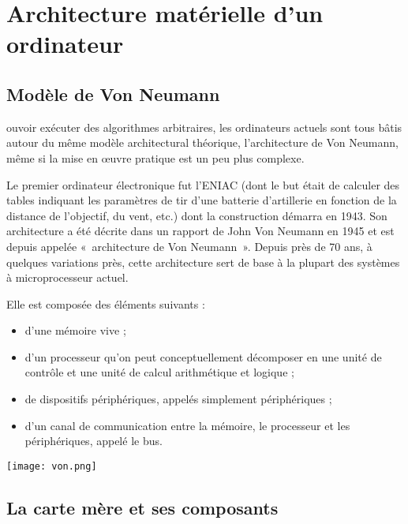 \section{Architecture matérielle d'un ordinateur}
\subsection{Modèle de Von Neumann}

 ouvoir exécuter des algorithmes arbitraires, les ordinateurs actuels sont tous bâtis
autour du même modèle architectural théorique, l’architecture de Von Neumann, même
si la mise en œuvre pratique est un peu plus complexe.

Le premier ordinateur électronique fut l’ENIAC
(dont le but était de calculer des tables indiquant les paramètres de tir d’une batterie d’artillerie
en fonction de la distance de l’objectif, du vent, etc.) dont la construction démarra
en 1943. 
Son architecture a été décrite dans un rapport de John Von Neumann en 1945 et
est depuis appelée «~architecture de Von Neumann~». Depuis près de 70 ans, à quelques variations
près, cette  architecture sert de base à la plupart des systèmes à microprocesseur actuel. 

\begin{minipage}[c]{.49\linewidth}
Elle est composée des éléments suivants :
\begin{itemize}
\item d'une mémoire vive ;
\item d'un processeur qu'on peut conceptuellement décomposer en une unité de contrôle et
une unité de calcul arithmétique et logique ;
\item de dispositifs périphériques, appelés simplement périphériques ;
\item d'un canal de communication entre la mémoire, le processeur et les périphériques, appelé
le bus.
\end{itemize}
\end{minipage} \hfill
\begin{minipage}[c]{.49\linewidth}
\begin{center}
\texttt{[image: von.png]}
\end{center}
\end{minipage}

\subsection{La carte mère et ses composants}

